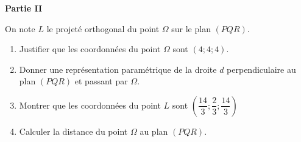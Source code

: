 \textbf{Partie II}

\medskip

On note $L$ le projeté orthogonal du point $\Omega$ sur le plan $(PQR)$.

\begin{enumerate}
	\item Justifier que les coordonnées du point $\Omega$ sont $(4;4;4)$.
	\item Donner une représentation paramétrique de la droite $d$ perpendiculaire au plan $(PQR)$ et passant par $\Omega$.
	\item Montrer que les coordonnées du point $L$ sont $\left(\dfrac{14}{3}; \dfrac{2}{3};\dfrac{14}{3}\right)$
	\item Calculer la distance du point $\Omega$ au plan $(PQR)$.
\end{enumerate}

